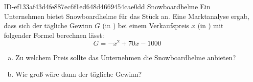 \begin{exercise}
      {ID-ef133af43d4fe887ec6f1ed648d4669454cae0dd}
      {Snowboardhelme}
  \ifproblem\problem
    Ein Unternehmen bietet Snowboardhelme für  das Stück an. Eine
    Marktanalyse ergab, dass sich der tägliche Gewinn $G$ (in \officialeuro)
    bei einem Verkaufspreis $x$ (in \officialeuro) mit folgender Formel
    berechnen lässt:
    \begin{equation*}
      G=-x^{2}+70x-1000
    \end{equation*}
    \begin{enumerate}[a)]
      \item Zu welchem Preis sollte das Unternehmen die Snowboardhelme
            anbieten?
      \item Wie groß wäre dann der tägliche Gewinn?
    \end{enumerate}
  \fi
\end{exercise}
